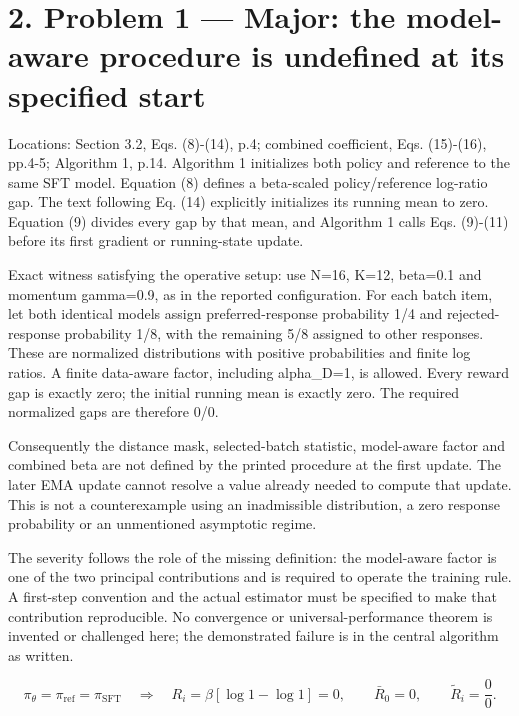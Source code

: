 \documentclass[10pt]{article}
\begin{document}
\section*{2. Problem 1 — Major: the model-aware procedure is undefined at its specified start}
Locations: Section 3.2, Eqs. (8)-(14), p.4; combined coefficient, Eqs. (15)-(16), pp.4-5; Algorithm 1, p.14. Algorithm 1 initializes both policy and reference to the same SFT model. Equation (8) defines a beta-scaled policy/reference log-ratio gap. The text following Eq. (14) explicitly initializes its running mean to zero. Equation (9) divides every gap by that mean, and Algorithm 1 calls Eqs. (9)-(11) before its first gradient or running-state update.\par
Exact witness satisfying the operative setup: use N=16, K=12, beta=0.1 and momentum gamma=0.9, as in the reported configuration. For each batch item, let both identical models assign preferred-response probability 1/4 and rejected-response probability 1/8, with the remaining 5/8 assigned to other responses. These are normalized distributions with positive probabilities and finite log ratios. A finite data-aware factor, including alpha\_D=1, is allowed. Every reward gap is exactly zero; the initial running mean is exactly zero. The required normalized gaps are therefore 0/0.\par
Consequently the distance mask, selected-batch statistic, model-aware factor and combined beta are not defined by the printed procedure at the first update. The later EMA update cannot resolve a value already needed to compute that update. This is not a counterexample using an inadmissible distribution, a zero response probability or an unmentioned asymptotic regime.\par
The severity follows the role of the missing definition: the model-aware factor is one of the two principal contributions and is required to operate the training rule. A first-step convention and the actual estimator must be specified to make that contribution reproducible. No convergence or universal-performance theorem is invented or challenged here; the demonstrated failure is in the central algorithm as written.\par
\[\pi_\theta=\pi_{\mathrm{ref}}=\pi_{\mathrm{SFT}}\quad\Longrightarrow\quad R_i=\beta[\log 1-\log 1]=0,\qquad \bar R_0=0,\qquad \widetilde R_i=\frac{0}{0}.\]\par
\end{document}

